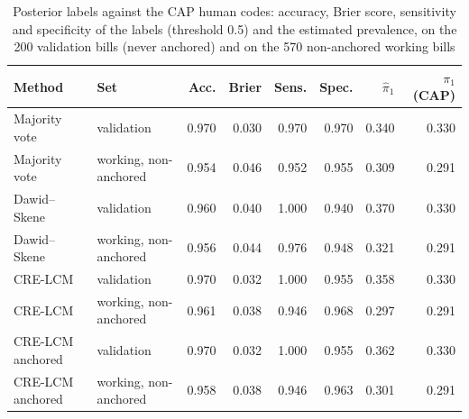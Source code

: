 \begin{table}[htbp]
\centering
\scriptsize
\setlength{\tabcolsep}{2.5pt}
\caption{Posterior labels against the CAP human codes: accuracy, Brier score, sensitivity and specificity of the labels (threshold 0.5) and the estimated prevalence, on the 200 validation bills (never anchored) and on the 570 non-anchored working bills}\label{tab:app_eval}
\begin{tabular}{llrrrrrr}
\toprule
Method & Set & Acc. & Brier & Sens. & Spec. & $\hat\pi_1$ & $\pi_1$ (CAP) \\
\midrule
Majority vote & validation & 0.970 & 0.030 & 0.970 & 0.970 & 0.340 & 0.330 \\
Majority vote & working, non-anchored & 0.954 & 0.046 & 0.952 & 0.955 & 0.309 & 0.291 \\
Dawid--Skene & validation & 0.960 & 0.040 & 1.000 & 0.940 & 0.370 & 0.330 \\
Dawid--Skene & working, non-anchored & 0.956 & 0.044 & 0.976 & 0.948 & 0.321 & 0.291 \\
CRE-LCM & validation & 0.970 & 0.032 & 1.000 & 0.955 & 0.358 & 0.330 \\
CRE-LCM & working, non-anchored & 0.961 & 0.038 & 0.946 & 0.968 & 0.297 & 0.291 \\
CRE-LCM anchored & validation & 0.970 & 0.032 & 1.000 & 0.955 & 0.362 & 0.330 \\
CRE-LCM anchored & working, non-anchored & 0.958 & 0.038 & 0.946 & 0.963 & 0.301 & 0.291 \\
\bottomrule
\end{tabular}
\end{table}
